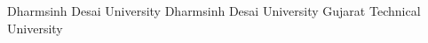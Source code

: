 


 {Dharmsinh Desai University}{} {}
 {Dharmsinh Desai University}{}{}
 {Gujarat Technical University}{} {}




